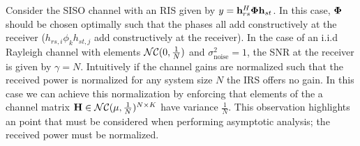 Consider the SISO channel with an RIS given by $y = \mathbf{h}_{rs}^H \boldsymbol{\Phi} \mathbf{h}_{st}$. In this case, $ \boldsymbol{\Phi}$ should be chosen optimally such that 
the phases all add constructively at the receiver (\ie $h_{rs,i} \phi_k h_{st,j}$ add constructively at the receiver). 
In the case of an i.i.d Rayleigh channel with elements $\mathcal{NC}(0,\frac{1}{N})$ and $\sigma^2_{\text{noise}} =1$, the SNR at the receiver is given by $\gamma = N$.
Intuitively if the channel gains are normalized such that the received power is normalized for any system size $N$ the IRS offers no gain. 
In this case we can achieve this normalization by enforcing that elements of the a channel matrix $\mathbf{H} \in \mathcal{NC}(\mu,\frac{1}{N})^{N \times K}$ have variance $\frac{1}{N}$.
This observation highlights an point that must be considered when performing asymptotic analysis; the received power must be normalized.
